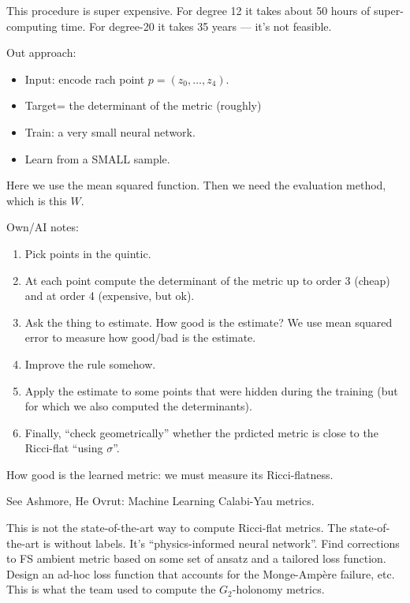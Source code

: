\noindent
This procedure is super expensive.
For degree 12 it takes about 50 hours
of super-computing time. For degree-20
it takes 35 years --- it's not feasible.

\medskip\noindent
Out approach:
\begin{itemize}
\item Input: encode rach point
$p=(z_0,…,z_4)$.
\item Target= the determinant of the metric
(roughly)
\item Train: a very small neural network.
\item Learn from a SMALL sample.
\end{itemize}

\noindent
Here we use the mean squared function.
Then we need the evaluation method, which
is this $W$.

Own/AI notes:
\begin{enumerate}
\item Pick points in the quintic.
\item At each point compute the determinant
of the metric up to order 3 (cheap) and
at order 4 (expensive, but ok).
\item Ask the thing to estimate.
How good is the estimate? We use mean
squared error to measure how good/bad is the
estimate.
\item Improve the rule somehow.
\item Apply the estimate to some points that
were hidden during the training (but for
which we also computed the determinants).
\item Finally, ``check geometrically''
whether the prdicted metric
is close to the Ricci-flat ``using
$\sigma$''.
\end{enumerate}

\noindent
How good is the learned metric:
we must measure its Ricci-flatness. 

See Ashmore, He Ovrut: Machine Learning
Calabi-Yau metrics.

\begin{remark}
\label{remark-not-standard}
This is not the state-of-the-art way to compute
Ricci-flat metrics. The state-of-the-art
is without labels. It's
``physics-informed neural network''.
Find corrections to FS ambient metric based
on some set of ansatz and a tailored loss
function. Design an ad-hoc loss function
that accounts for the Monge-Ampère failure,
etc. This is what the team used
to compute the $G_2$-holonomy metrics.
\end{remark}




